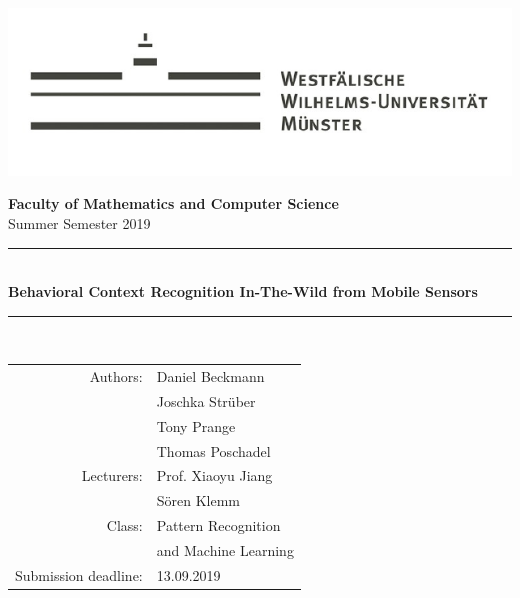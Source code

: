 \documentclass[a4paper,12pt]{scrartcl}
\begin{document}
	
	
	\begin{singlespace}
		\begin{titlepage}
			\begin{center}
				
				\includegraphics[scale=0.6]{wwu}
				
				\large{\textbf{\textsf{Faculty of Mathematics and Computer Science}}\\ 
					Summer Semester 2019} \\
				\vspace{20mm}
				\rule{.8\linewidth}{1pt}\\
				\vspace{3mm}
				\LARGE\textbf{\textsf{Behavioral Context Recognition In-The-Wild from Mobile Sensors}}\\
				\rule{.8\linewidth}{1pt}\\
				
				\vfill
			\end{center}
			\begin{flushright}
				\flushright
				
				\begin{large}
					\singlespacing 		
					\begin{tabular}{rl}
						
						Authors: & Daniel Beckmann \\ & Joschka Strüber \\& Tony Prange \\& Thomas Poschadel \\
						\midrule
						Lecturers: & Prof. Xiaoyu Jiang \\
						& Sören Klemm \\
						Class:& Pattern Recognition \\ & and Machine Learning \\
						Submission deadline: & 13.09.2019
						
					\end{tabular}
				\end{large}	
			\end{flushright}
			
			\flushleft
		\end{titlepage}
		
		\newpage  \tableofcontents \thispagestyle{empty} \vspace{15mm}
		
		
	\end{singlespace}
\end{document}
